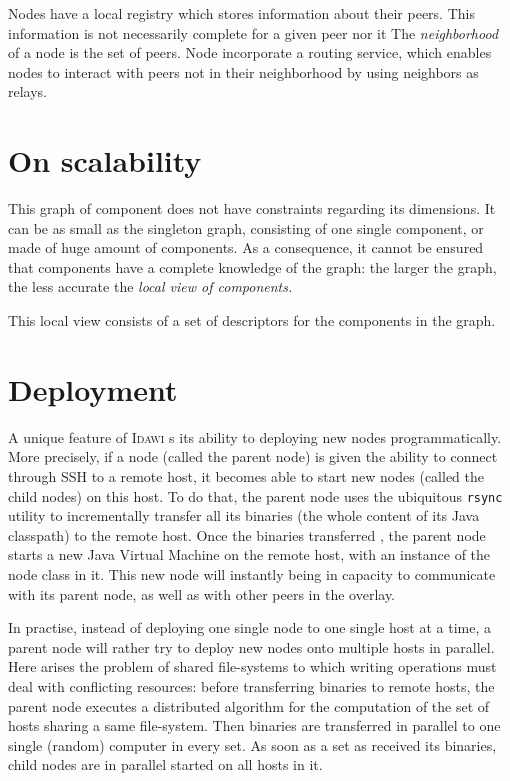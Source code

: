 \documentclass{article}
\newcommand{\idawi}[1]{\textsc{Idawi}\xspace}
\begin{document}
Nodes have a local registry which stores information about their peers. This information is not necessarily complete for a given peer nor it  The \textit{neighborhood} of a node is the set of peers. Node incorporate a routing service, which enables nodes to interact with peers not in their neighborhood by 
using neighbors as relays.

\section{On scalability}
This graph of component does not have constraints regarding its dimensions. It can be as small as the singleton graph, consisting of one single component, or made of huge amount of components.  As a consequence, it cannot be ensured that components have a complete knowledge of the graph: the larger the graph, the less accurate the \em{local view} of components.

This local view consists of a set of descriptors for the components in the graph. 

\section{Deployment}
A unique feature of \idawi is its ability to deploying new nodes programmatically.
More precisely, if a node (called the parent node) is given the ability to connect through SSH to a remote host, it becomes able to start new nodes (called the child nodes) on this host.
To do that, the parent node uses the ubiquitous \texttt{rsync} utility to incrementally transfer all its binaries (the whole content of its Java classpath) to the remote host. Once the binaries transferred , the parent node starts a new Java Virtual Machine on the remote host, with an instance of the node class in it. This new node will instantly being in capacity to communicate with its parent node, as well as with other peers in the overlay.

In practise, instead of deploying one single node to one single host at a time, a parent node will rather try to deploy new nodes onto multiple hosts in parallel. Here arises the problem of shared file-systems to which writing operations must deal with  conflicting resources: before transferring binaries to remote hosts, the parent node executes a distributed algorithm for the computation of the set of hosts sharing a same file-system. Then binaries are transferred in parallel to one single (random) computer in every set. As soon as a set as received its binaries, child nodes are in parallel  started on all hosts in it.
\end{document}
